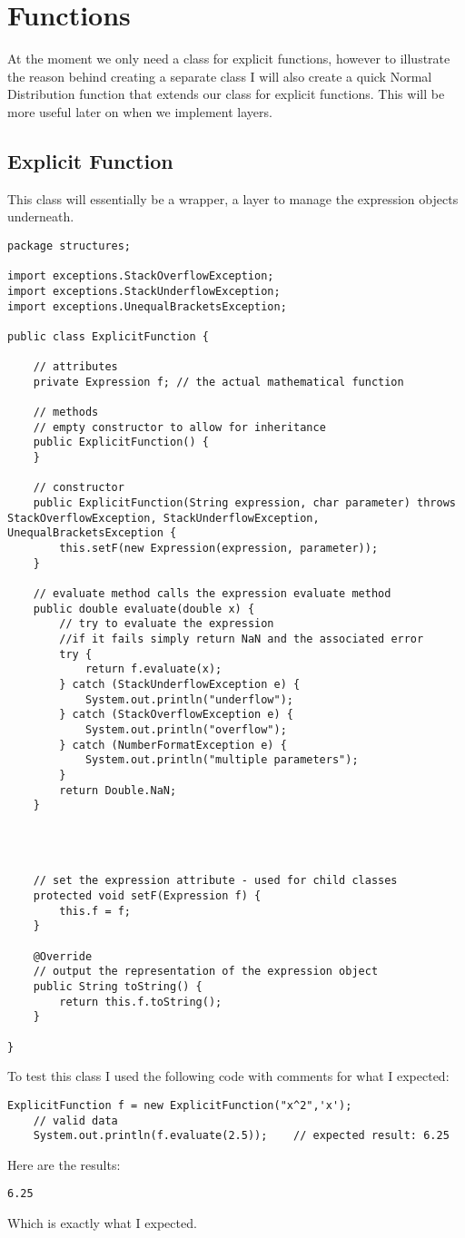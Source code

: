 \documentclass[../../../../main.tex]{subfiles}
\begin{document}
\section{Functions}
At the moment we only need a class for explicit functions, however to illustrate the reason behind creating a separate class I will also create a quick Normal Distribution function that extends our class for explicit functions. This will be more useful later on when we implement layers.

\subsection{Explicit Function}
This class will essentially be a wrapper, a layer to manage the expression objects underneath. 
\begin{verbatim}
package structures;

import exceptions.StackOverflowException;
import exceptions.StackUnderflowException;
import exceptions.UnequalBracketsException;

public class ExplicitFunction {

	// attributes
	private Expression f; // the actual mathematical function

	// methods
	// empty constructor to allow for inheritance
	public ExplicitFunction() {
	}

	// constructor
	public ExplicitFunction(String expression, char parameter) throws StackOverflowException, StackUnderflowException, UnequalBracketsException {
		this.setF(new Expression(expression, parameter));
	}

	// evaluate method calls the expression evaluate method
	public double evaluate(double x) {
		// try to evaluate the expression
		//if it fails simply return NaN and the associated error
		try {
			return f.evaluate(x);
		} catch (StackUnderflowException e) {
			System.out.println("underflow");
		} catch (StackOverflowException e) {
			System.out.println("overflow");
		} catch (NumberFormatException e) {
			System.out.println("multiple parameters");
		}
		return Double.NaN;
	}




	// set the expression attribute - used for child classes
	protected void setF(Expression f) {
		this.f = f;
	}

	@Override
	// output the representation of the expression object
	public String toString() {
		return this.f.toString();
	}

}
\end{verbatim}
To test this class I used the following code with comments for what I expected:
\begin{verbatim}
ExplicitFunction f = new ExplicitFunction("x^2",'x');
	// valid data
	System.out.println(f.evaluate(2.5));	// expected result: 6.25
\end{verbatim}
Here are the results:
\begin{verbatim}
6.25
\end{verbatim}
Which is exactly what I expected.
\end{document}
